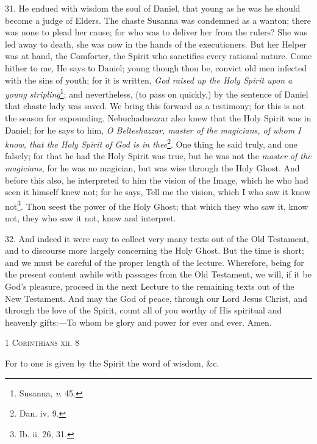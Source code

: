 31. He endued with wisdom the soul of Daniel, that young as he was he should become a judge of Elders. The chaste Susanna was condemned as a wanton; there was none to plead her cause; for who was to deliver her from the rulers? She was led away to death, she was now in the hands of the executioners. But her Helper was at hand, the Comforter, the Spirit who sanctifies every rational nature. Come hither to me, He says to Daniel; young though thou be, convict old men infected with the sins of youth; for it is written, \emph{God raised up the Holy Spirit upon a young stripling}\footnote{Susanna, \emph{v}. 45.}; and nevertheless, (to pass on quickly,) by the sentence of Daniel that chaste lady was saved. We bring this forward as a testimony; for this is not the season for expounding. Nebuchadnezzar also knew that the Holy Spirit was in Daniel; for he says to him, \emph{O Belteshazzar, master of the magicians, of whom I know, that the Holy Spirit of God is in thee}\footnote{Dan. iv. 9.}. One thing he said truly, and one falsely; for that he had the Holy Spirit was true, but he was not the \emph{master of the magicians}, for he was no magician, but was wise through the Holy Ghost. And before this also, he interpreted to him the vision of the Image, which he who had seen it himself knew not; for he says, Tell me the vision, which I who saw it know not\footnote{Ib. ii. 26, 31.}. Thou seest the power of the Holy Ghost; that which they who saw it, know not, they who saw it not, know and interpret.

32. And indeed it were easy to collect very many texts out of the Old Testament, and to discourse more largely concerning the Holy Ghost. But the time is short; and we must be careful of the proper length of the lecture. Wherefore, being for the present content awhile with passages from the Old Testament, we will, if it be God’s pleasure, proceed in the next Lecture to the remaining texts out of the New Testament. And may the God of peace, through our Lord Jesus Christ, and through the love of the Spirit, count all of you worthy of His spiritual and heavenly gifts:—To whom be glory and power for ever and ever. Amen.


\textsc{1 Corinthians xii. 8}

For to one is given by the Spirit the word of wisdom, \&c.

